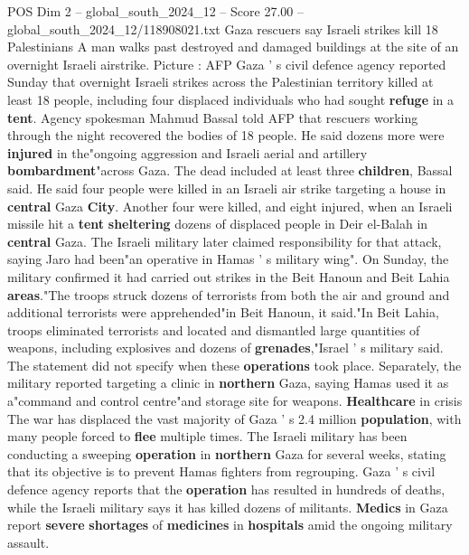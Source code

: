 \begin{textsample}{POS Dim 2 – global\_south\_2024\_12 – Score 27.00 – global\_south\_2024\_12/118908021.txt}  \label{ex:f2_pos_067}
Gaza rescuers say Israeli strikes kill 18 Palestinians A man walks past destroyed and damaged buildings at the site of an overnight Israeli airstrike.
Picture : AFP Gaza ' s civil defence agency reported Sunday that overnight Israeli strikes across the Palestinian territory killed at least 18 people, including four displaced individuals who had sought \textbf{refuge} in a \textbf{tent}.
Agency spokesman Mahmud Bassal told AFP that rescuers working through the night recovered the bodies of 18 people.
He said dozens more were \textbf{injured} in the"ongoing aggression and Israeli aerial and artillery \textbf{bombardment}"across Gaza.
The dead included at least three \textbf{children}, Bassal said.
He said four people were killed in an Israeli air strike targeting a house in \textbf{central} Gaza \textbf{City}.
Another four were killed, and eight injured, when an Israeli missile hit a \textbf{tent} \textbf{sheltering} dozens of displaced people in Deir el-Balah in \textbf{central} Gaza.
The Israeli military later claimed responsibility for that attack, saying Jaro had been"an operative in Hamas ' s military wing".
On Sunday, the military confirmed it had carried out strikes in the Beit Hanoun and Beit Lahia \textbf{areas}."The troops struck dozens of terrorists from both the air and ground and additional terrorists were apprehended"in Beit Hanoun, it said."In Beit Lahia, troops eliminated terrorists and located and dismantled large quantities of weapons, including explosives and dozens of \textbf{grenades},"Israel ' s military said.
The statement did not specify when these \textbf{operations} took place.
Separately, the military reported targeting a clinic in \textbf{northern} Gaza, saying Hamas used it as a"command and control centre"and storage site for weapons. \textbf{Healthcare} in crisis The war has displaced the vast majority of Gaza ' s 2.4 million \textbf{population}, with many people forced to \textbf{flee} multiple times.
The Israeli military has been conducting a sweeping \textbf{operation} in \textbf{northern} Gaza for several weeks, stating that its objective is to prevent Hamas fighters from regrouping.
Gaza ' s civil defence agency reports that the \textbf{operation} has resulted in hundreds of deaths, while the Israeli military says it has killed dozens of militants. \textbf{Medics} in Gaza report \textbf{severe} \textbf{shortages} of \textbf{medicines} in \textbf{hospitals} amid the ongoing military assault.

\end{textsample}
